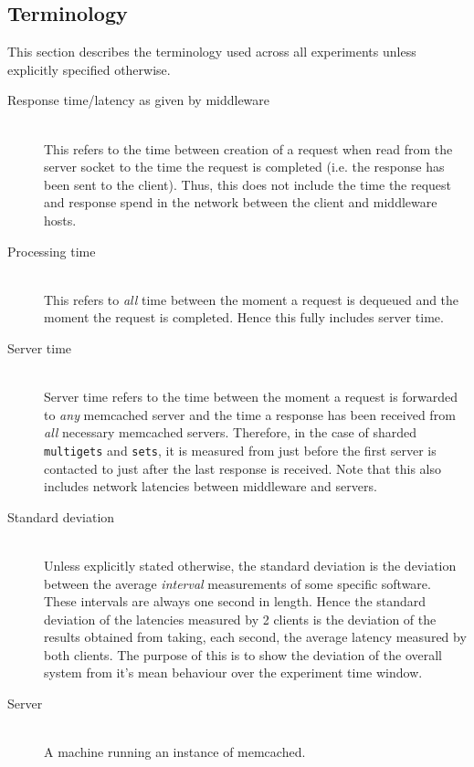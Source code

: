 \documentclass[11pt,a4paper]{article}
\begin{document}
\subsection{Terminology}
This section describes the terminology used across all experiments unless explicitly specified otherwise.
\begin{description}
    \item[Response time/latency as given by middleware]\hfill\\ This refers to the time between creation of a request when read from the server socket to the time the request is completed (i.e. the response has been sent to the client). Thus, this does not include the time the request and response spend in the network between the client and middleware hosts.
    \item[Processing time]\hfill\\ This refers to \textit{all} time between the moment a request is dequeued and the moment the request is completed. Hence this fully includes server time.
    \item[Server time]\hfill\\ Server time refers to the time between the moment a request is forwarded to \textit{any} memcached server and the time a response has been received from \textit{all} necessary memcached servers. Therefore, in the case of sharded \texttt{multigets} and \texttt{sets}, it is measured from just before the first server is contacted to just after the last response is received. Note that this also includes network latencies between middleware and servers.
    \item[Standard deviation]\hfill\\ Unless explicitly stated otherwise, the standard deviation is the deviation between the average \textit{interval} measurements of some specific software. These intervals are always one second in length. Hence the standard deviation of the latencies measured by 2 clients is the deviation of the results obtained from taking, each second, the average latency measured by both clients. The purpose of this is to show the deviation of the overall system from it's mean behaviour over the experiment time window.
    \item[Server]\hfill\\ A machine running an instance of memcached.
\end{description}
\end{document}

